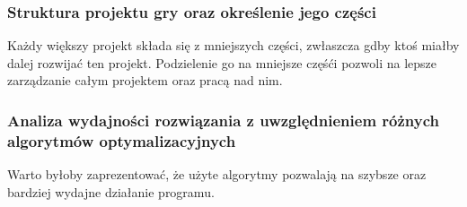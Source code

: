 \documentclass[12pt]{article}
\begin{document}
\subsubsection{Struktura projektu gry oraz określenie jego części}
Każdy większy projekt składa się z mniejszych części, zwłaszcza gdby ktoś miałby dalej rozwijać ten projekt. Podzielenie go na mniejsze częśći pozwoli na lepsze zarządzanie całym projektem oraz pracą nad nim.
\\
\subsubsection{Analiza wydajności rozwiązania z uwzględnieniem różnych algorytmów optymalizacyjnych}
Warto byłoby zaprezentować, że użyte algorytmy pozwalają na szybsze oraz bardziej wydajne działanie programu.
\\
\end{document}
